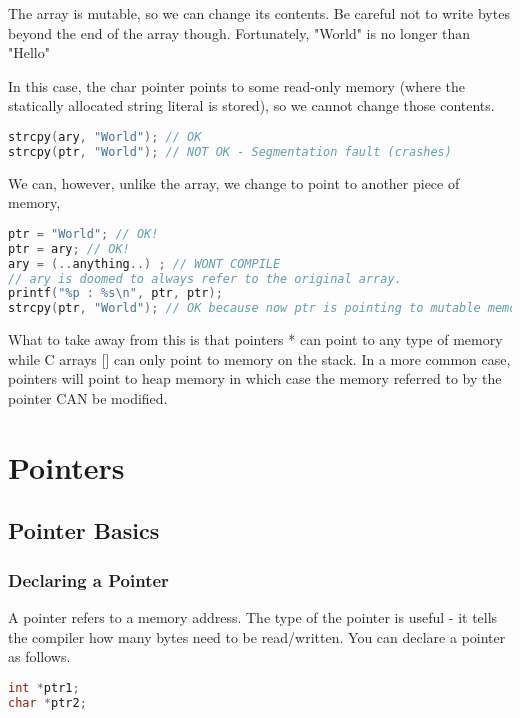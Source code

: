 The array is mutable, so we can change its contents. Be careful not to write bytes beyond the end of the array though. Fortunately, "World" is no longer than "Hello"

In this case, the char pointer  points to some read-only memory (where the statically allocated string literal is stored), so we cannot change those contents.

\begin{lstlisting}[language=C]
strcpy(ary, "World"); // OK
strcpy(ptr, "World"); // NOT OK - Segmentation fault (crashes)
\end{lstlisting}

We can, however, unlike the array, we change  to point to
another piece of memory,

\begin{lstlisting}[language=C]
ptr = "World"; // OK!
ptr = ary; // OK!
ary = (..anything..) ; // WONT COMPILE
// ary is doomed to always refer to the original array.
printf("%p : %s\n", ptr, ptr);
strcpy(ptr, "World"); // OK because now ptr is pointing to mutable memory (the array)
\end{lstlisting}

What to take away from this is that pointers * can point to any type of memory while C arrays {[}{]} can only point to memory on the stack. In a more common case, pointers will point to heap memory in which case the memory referred to by the pointer CAN be modified.


\section{Pointers}

\subsection{Pointer Basics}

\subsubsection{Declaring a Pointer}

A pointer refers to a memory address. The type of the pointer is useful
- it tells the compiler how many bytes need to be read/written. You can
declare a pointer as follows.

\begin{lstlisting}[language=C]
int *ptr1;
char *ptr2;
\end{lstlisting}

